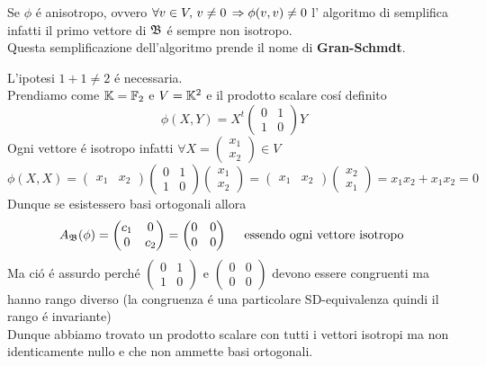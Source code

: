 \begin{oss}Se $\phi$ \'e anisotropo, ovvero $\forall v \in V , \, v \neq 0 \, \Rightarrow \phi(v,v) \neq 0 $ l' algoritmo di semplifica infatti il primo vettore di $\mathfrak{B}$ \'e sempre non isotropo.\\
Questa semplificazione dell'algoritmo prende il nome di \textbf{Gran-Schmdt}.
\spazio
\end{oss}
\begin{oss} L'ipotesi $1+1 \neq 2 $ \'e necessaria.\\
Prendiamo come $\mathbb{K}=\mathbb{F}_2 $ e $V=\mathbb{K}^2 $ e il prodotto scalare cos\'i definito
$$ \phi(X,Y) =  X^t \begin{pmatrix}
0 & 1 \\ 1 & 0
\end{pmatrix} Y $$
Ogni vettore \'e isotropo infatti
$\forall X=\begin{pmatrix}
x_1 \\x_2 
\end{pmatrix} \in V  $ 
$$ \phi (X,X) = \begin{pmatrix}
x_1 & x_2 
\end{pmatrix} \begin{pmatrix}
0 & 1 \\ 1 &0 
\end{pmatrix} \begin{pmatrix}
x_1 \\x_2 
\end{pmatrix} = \begin{pmatrix}
x_1 & x_2 
\end{pmatrix} \begin{pmatrix}
x_2 \\x_1 
\end{pmatrix} = x_1x_2 + x_1x_2 =0 $$
Dunque se esistessero basi ortogonali allora
$$ A_{\mathfrak{B}} (\phi) = \begin{pmatrix}
c_1 & 0 \\
0 & c_2 
\end{pmatrix} =\begin{pmatrix}
0 & 0 \\ 0 & 0 
\end{pmatrix} \quad \text{ essendo ogni vettore isotropo } $$
Ma ci\'o \'e assurdo perch\'e $\begin{pmatrix}
0 & 1 \\ 1 & 0
\end{pmatrix} $ e $\begin{pmatrix}
0 & 0 \\ 0 & 0 
\end{pmatrix} $ devono essere congruenti ma hanno rango diverso (la congruenza \'e una particolare SD-equivalenza quindi il rango \'e invariante)\\
Dunque abbiamo trovato un prodotto scalare con tutti i vettori isotropi ma non identicamente nullo e che non ammette basi ortogonali.
\end{oss}
\newpage

